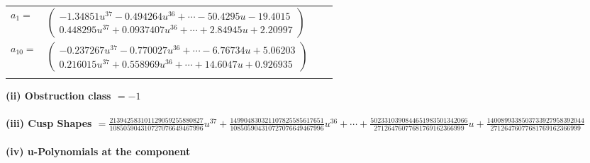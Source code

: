\documentclass[1p]{elsarticle_modified}
\theoremstyle{definition}
\begin{document}
\begin{tabular}{m{7pt} m{180pt} m{7pt} m{180pt} }
\flushright $a_{1}=$&$\begin{pmatrix}-1.34851 u^{37}-0.494264 u^{36}+\cdots-50.4295 u-19.4015\\0.448295 u^{37}+0.0937407 u^{36}+\cdots+2.84945 u+2.20997\end{pmatrix}$ \\
\flushright $a_{10}=$&$\begin{pmatrix}-0.237267 u^{37}-0.770027 u^{36}+\cdots-6.76734 u+5.06203\\0.216015 u^{37}+0.558969 u^{36}+\cdots+14.6047 u+0.926935\end{pmatrix}$\\&\end{tabular}
\flushleft \textbf{(ii) Obstruction class $= -1$}\\~\\
\flushleft \textbf{(iii) Cusp Shapes $= \frac{213942583101129059255880827}{108505904310727076649467996} u^{37}+\frac{149904830321107825585617651}{108505904310727076649467996} u^{36}+\cdots+\frac{5023310390844651983501342066}{27126476077681769162366999} u+\frac{1400899338503733927958392044}{27126476077681769162366999}$}\\~\\
\newpage\renewcommand{\arraystretch}{1}
\flushleft \textbf{(iv) u-Polynomials at the component}\newline \\
\end{document}

